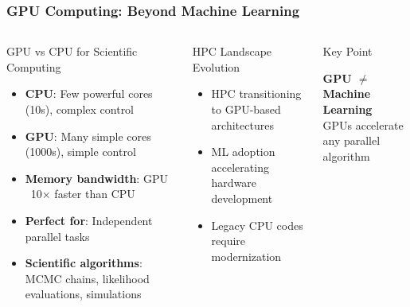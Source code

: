 \documentclass[aspectratio=169]{beamer}
\begin{document}
\begin{frame}
    \frametitle{GPU Computing: Beyond Machine Learning}
    \begin{columns}
        \begin{block}{GPU vs CPU for Scientific Computing}
            \begin{itemize}
                \item \textbf{CPU}: Few powerful cores (10s), complex control
                \item \textbf{GPU}: Many simple cores (1000s), simple control
                \item \textbf{Memory bandwidth}: GPU ~10× faster than CPU
                \item \textbf{Perfect for}: Independent parallel tasks
                \item \textbf{Scientific algorithms}: MCMC chains, likelihood evaluations, simulations
            \end{itemize}
        \end{block}
        \begin{block}{HPC Landscape Evolution}
            \begin{itemize}
                \item HPC transitioning to GPU-based architectures
                \item ML adoption accelerating hardware development
                \item Legacy CPU codes require modernization
            \end{itemize}
        \end{block}
        \begin{block}{Key Point}
            \begin{center}
                \textbf{GPU $\neq$ Machine Learning}\\
                GPUs accelerate any parallel algorithm
            \end{center}
        \end{block}
    \end{columns}
\end{frame}
\end{document}
